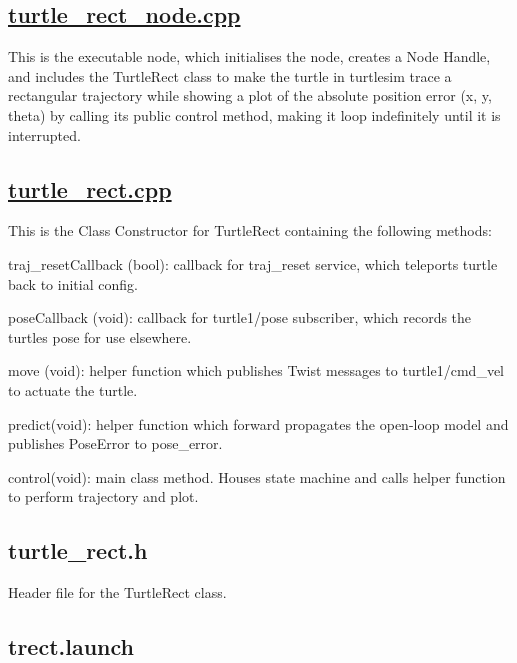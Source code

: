 \subsection*{\hyperlink{turtle__rect__node_8cpp}{turtle\+\_\+rect\+\_\+node.\+cpp}}

This is the executable node, which initialises the node, creates a {\ttfamily Node Handle}, and includes the {\ttfamily Turtle\+Rect} class to make the turtle in turtlesim trace a rectangular trajectory while showing a plot of the absolute position error (x, y, theta) by calling its public {\ttfamily control} method, making it loop indefinitely until it is interrupted.

\subsection*{\hyperlink{turtle__rect_8cpp}{turtle\+\_\+rect.\+cpp}}

This is the Class Constructor for {\ttfamily Turtle\+Rect} containing the following methods\+:


\begin{DoxyItemize}
\item {\ttfamily traj\+\_\+reset\+Callback (bool)}\+: callback for {\ttfamily traj\+\_\+reset service}, which teleports turtle back to initial config.
\item {\ttfamily pose\+Callback (void)}\+: callback for {\ttfamily turtle1/pose} subscriber, which records the turtle\textquotesingle{}s pose for use elsewhere.
\item {\ttfamily move (void)}\+: helper function which publishes {\ttfamily Twist} messages to {\ttfamily turtle1/cmd\+\_\+vel} to actuate the turtle.
\item {\ttfamily predict(void)}\+: helper function which forward propagates the open-\/loop model and publishes {\ttfamily Pose\+Error} to {\ttfamily pose\+\_\+error}.
\item {\ttfamily control(void)}\+: main class method. Houses state machine and calls helper function to perform trajectory and plot.
\end{DoxyItemize}

\subsection*{turtle\+\_\+rect.\+h}

Header file for the {\ttfamily Turtle\+Rect} class.

\subsection*{trect.\+launch}

